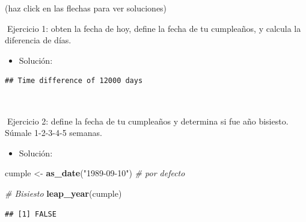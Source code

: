 \documentclass[11pt,]{book}
\newenvironment{Shaded}{\begin{snugshade}}{\end{snugshade}}
\newcommand{\CommentTok}[1]{\textcolor[rgb]{0.37,0.37,0.37}{\textit{#1}}}
\newcommand{\DataTypeTok}[1]{\textcolor[rgb]{0.27,0.27,0.27}{#1}}
\newcommand{\KeywordTok}[1]{\textcolor[rgb]{0.27,0.27,0.27}{\textbf{#1}}}
\newcommand{\NormalTok}[1]{#1}
\newcommand{\OperatorTok}[1]{\textcolor[rgb]{0.43,0.43,0.43}{\textbf{#1}}}
\newcommand{\StringTok}[1]{\textcolor[rgb]{0.5,0.5,0.5}{#1}}
\providecommand{\tightlist}{%
  \setlength{\itemsep}{0pt}\setlength{\parskip}{0pt}}
\begin{document}
(haz click en las flechas para ver soluciones)

📝Ejercicio 1: obten la fecha de hoy, define la fecha de tu cumpleaños, y calcula la diferencia de días.

\begin{itemize}
\tightlist
\item
  Solución:
\end{itemize}

\begin{Shaded}
\end{Shaded}

\begin{verbatim}
## Time difference of 12000 days
\end{verbatim}

~

📝Ejercicio 2: define la fecha de tu cumpleaños y determina si fue año bisiesto. Súmale 1-2-3-4-5 semanas.

\begin{itemize}
\tightlist
\item
  Solución:
\end{itemize}

\begin{Shaded}
\begin{Highlighting}[]
\NormalTok{cumple <-}\StringTok{ }\KeywordTok{as_date}\NormalTok{(}\StringTok{"1989-09-10"}\NormalTok{) }\CommentTok{# por defecto}

\CommentTok{# Bisiesto}
\KeywordTok{leap_year}\NormalTok{(cumple)}
\end{Highlighting}
\end{Shaded}

\begin{verbatim}
## [1] FALSE
\end{verbatim}
\end{document}
